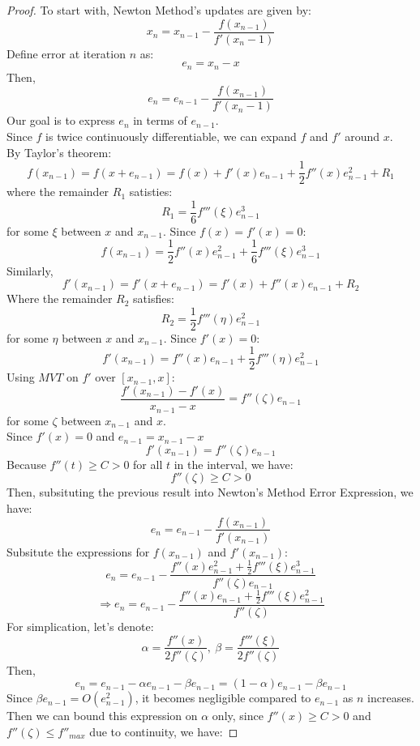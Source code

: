 \documentclass{article}
\begin{document}
\begin{proof}
    To start with, Newton Method's updates are given by:
    \[ x_n = x_{n - 1} - \frac{f(x_{n - 1})}{f'(x_n - 1)} \]
    Define error at iteration $n$ as:
    \[ e_n = x_n - x \]
    Then, 
    \[ e_n = e_{n - 1} - \frac{f(x_{n - 1})}{f'(x_n - 1)} \]
    Our goal is to express $e_n$ in terms of $e_{n - 1}$.
    \\
    Since $f$ is twice continuously differentiable, we can expand $f$ and $f'$ around $x$.
    \\
    By Taylor's theorem:
    \[ f(x_{n - 1}) = f(x + e_{n-1}) = f(x) + f'(x)e_{n - 1} + \frac{1}{2}f''(x)e^2_{n-1} + R_1 \]
    where the remainder $R_1$ satisties: 
    \[ R_1 = \frac{1}{6}f'''(\xi)e^3_{n - 1} \]
    for some $\xi$ between $x$ and $x_{n - 1}$. Since $f(x) = f'(x) = 0$:
    \[ f(x_{n - 1}) = \frac{1}{2} f''(x)e^2_{n-1} + \frac{1}{6}f'''(\xi)e^3_{n - 1} \]
    Similarly,
    \[ f'(x_{n - 1}) = f'(x + e_{n - 1}) = f'(x) + f''(x)e_{n - 1} + R_2 \]
    Where the remainder $R_2$ satisfies:
    \[ R_2 = \frac{1}{2}f'''(\eta)e^2_{n - 1} \]
    for some $\eta$ between $x$ and $x_{n-1}$. Since $f'(x) = 0$:
    \[ f'(x_{n - 1}) = f''(x)e_{n - 1} + \frac{1}{2}f'''(\eta)e^2_{n - 1} \]
    Using $MVT$ on $f'$ over $[x_{n-1}, x]$:
    \[ \frac{f'(x_{n - 1}) - f'(x)}{x_{n-1} - x} = f''(\zeta)e_{n-1} \]
    for some $\zeta$ between $x_{n - 1}$ and $x$.
    \\
    Since $f'(x) = 0$ and $e_{n-1} = x_{n-1} - x$
    \[ f'(x_{n-1}) = f''(\zeta)e_{n-1} \]
    Because $f''(t) \geq C > 0$ for all $t$ in the interval, we have:
    \[ f''(\zeta) \geq C > 0 \]
    Then, subsituting the previous result into Newton's Method Error Expression, we have:
    \[ e_n = e_{n-1} - \frac{f(x_{n-1})}{f'(x_{n-1})} \]
    Subsitute the expressions for $f(x_{n-1})$ and $f'(x_{n-1})$:
    \[ e_n = e_{n-1} - \frac{f''(x)e^2_{n - 1} + \frac{1}{2}f'''(\xi)e^3_{n - 1}}{f''(\zeta) e_{n-1}} \]
    \[ \Rightarrow e_n = e_{n-1} - \frac{f''(x)e_{n - 1} + \frac{1}{2}f'''(\xi)e^2_{n - 1}}{f''(\zeta)} \]
    For simplication, let's denote:
    \[ \alpha = \frac{f''(x)}{2f''(\zeta)}, \ \beta = \frac{f'''(\xi)}{2f''(\zeta)} \]
    Then,
    \[ e_n = e_{n-1} - \alpha e_{n - 1} - \beta e_{n - 1} = (1 - \alpha)e_{n - 1} - \beta e_{n - 1} \]
    Since $\beta e_{n - 1} = O(e^2_{n-1})$, it becomes negligible compared to $e_{n - 1}$ as $n$ increases.
    \\
    Then we can bound this expression on $\alpha$ only, since $f''(x) \geq C > 0$ and $f''(\zeta) \leq f''_{max}$ due to continuity, we have:

\end{proof}
\end{document}
